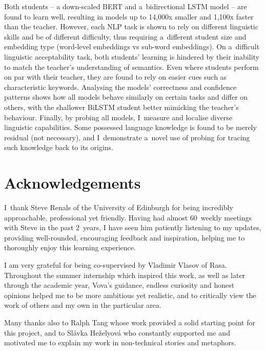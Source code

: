 \documentclass[bsc,frontabs,singlespacing,parskip,deptreport]{infthesis}
\begin{document}
{  Both students -- a down-scaled BERT and a~bidirectional LSTM model -- are found to learn well, resulting in models up to 14,000x smaller and 1,100x faster than the teacher.
  However, each NLP task is shown to rely on different linguistic skills and be of different difficulty, thus requiring a~different student size and embedding type (word-level embeddings vs sub-word embeddings).
  On a~difficult linguistic acceptability task, both students' learning is hindered by their inability to match the teacher's understanding of semantics.
  Even where students perform on par with their teacher, they are found to rely on easier cues such as characteristic keywords.
  Analysing the models' correctness and confidence patterns shows how all models behave similarly on certain tasks and differ on others, with the shallower BiLSTM student better mimicking the teacher's behaviour.
  Finally, by probing all models, I~measure and localise diverse linguistic capabilities.
  Some possessed language knowledge is found to be merely residual (not necessary),
  and I~demonstrate a~novel use of probing for tracing such knowledge back to its origins.
}

\maketitle

\section*{Acknowledgements}{
  I~thank Steve Renals of the University of Edinburgh for being incredibly approachable, professional yet friendly. Having had almost 60~weekly meetings with Steve in the past 2~years, I have seen him patiently listening to my updates, providing well-rounded, encouraging feedback and inspiration, helping me to thoroughly enjoy this learning experience.

  I am very grateful for being co-supervised by Vladimir Vlasov of Rasa. Throughout the summer internship which inspired this work, as well as later through the academic year, Vova's guidance, endless curiosity and honest opinions helped me to be more ambitious yet realistic, and to critically view the work of others and my own in the particular area.

  Many thanks also to Ralph Tang whose work provided a solid starting point for this project, and to Sl\'avka He\v{z}elyov\'a who constantly supported me and motivated me to explain my work in non-technical stories and metaphors.
}
\end{document}
